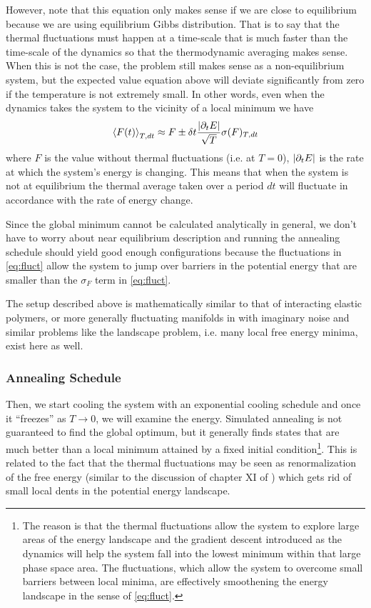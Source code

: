 \documentclass[nofootinbib,preprint,floatfix,titlepage,superscriptaddress]{revtex4} %
\begin{document}
However, note that this equation only makes sense if we are close to equilibrium because we are using equilibrium Gibbs distribution. That is to say that the thermal fluctuations must happen at a time-scale that is much faster than the time-scale of the dynamics so that the thermodynamic averaging makes sense. When this is not the case, the problem still makes sense as a non-equilibrium system, but the expected value equation above will deviate significantly from zero if the temperature is not extremely small. In other words, even when the dynamics takes the system to the vicinity of a local minimum we have 
\begin{equation}
\left<F(t)\right>_{T,dt} \approx F \pm \delta t {|\partial_t E|\over \sqrt{T}} \sigma(F)_{T,dt} \label{eq:fluct}  
\end{equation}
where $F$ is the value without thermal fluctuations (i.e. at $T=0$), $|\partial_t E|$ is the rate at which the system's energy is changing. This means that when the system is not at equilibrium the thermal average taken over a period $dt$ will fluctuate in accordance with the rate of energy change. 



Since the global minimum cannot be calculated analytically in general, we don't have to worry about near equilibrium description and running the annealing schedule should yield good enough configurations because the fluctuations in \eqref{eq:fluct} allow the system to jump over barriers in the potential energy that are smaller than the $\sigma_F$ term in \eqref{eq:fluct}. 

The setup described above is mathematically similar to that of interacting elastic polymers, or more generally fluctuating manifolds in \cite{mezard1991replica} with imaginary noise and similar problems like the landscape problem, i.e. many local free energy minima, exist here as well. 

\subsubsection{Annealing Schedule}
Then, we start cooling the system with an exponential cooling schedule and once it ``freezes'' as $T \to 0$, we will examine the energy. Simulated annealing is not guaranteed to find the global optimum, but it generally finds states that are much better than a local minimum attained by a fixed initial condition\footnote{ The reason is that the thermal fluctuations allow the system to explore large areas of the energy landscape and the gradient descent introduced as the dynamics will help the system fall into the lowest minimum within that large phase space area. The fluctuations, which allow the system to overcome small barriers between local minima, are effectively smoothening the energy landscape in the sense of \eqref{eq:fluct}. }. This is related to the fact that the thermal fluctuations may be seen as renormalization of the free energy (similar to the discussion of chapter XI of \cite{de1979scaling}) which gets rid of small local dents in the potential energy landscape.  
\end{document}
